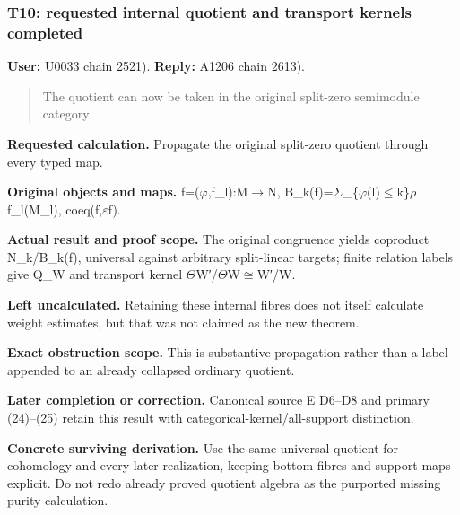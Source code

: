 \subsubsection{T10: requested internal quotient and transport kernels
completed}\label{TranscriptLedgerStage:t10-requested-internal-quotient-and-transport-kernels-completed}

\textbf{User:} U0033
\protect{} chain 2521).
\textbf{Reply:} A1206
\protect{} chain 2613).

\begin{quote}
The quotient can now be taken in the original split-zero semimodule
category
\end{quote}

\textbf{Requested calculation.} Propagate the original split-zero
quotient through every typed map.

\textbf{Original objects and maps.}
f=(\allowbreak{}\ensuremath{φ}\allowbreak{},f\_l):M\allowbreak{}\ensuremath{→}\allowbreak{}N,
B\_k(f)=\allowbreak{}\ensuremath{Σ}\allowbreak{}\_\{\allowbreak{}\ensuremath{φ}\allowbreak{}(l)\allowbreak{}\ensuremath{≤}\allowbreak{}k\}\allowbreak{}\ensuremath{ρ}\allowbreak{}
f\_l(M\_l), coeq(f,\allowbreak{}\ensuremath{ε}\allowbreak{}f).

\textbf{Actual result and proof scope.} The original congruence yields
coproduct N\_k/B\_k(f), universal against arbitrary split-linear
targets; finite relation labels give Q\_W and transport kernel
\allowbreak{}\ensuremath{Θ}\allowbreak{}W′/\allowbreak{}\ensuremath{Θ}\allowbreak{}W\allowbreak{}\ensuremath{≅}\allowbreak{}W′/W.

\textbf{Left uncalculated.} Retaining these internal fibres does not
itself calculate weight estimates, but that was not claimed as the new
theorem.

\textbf{Exact obstruction scope.} This is substantive propagation rather
than a label appended to an already collapsed ordinary quotient.

\textbf{Later completion or correction.} Canonical source E D6--D8 and
primary (24)--(25) retain this result with
categorical-kernel/all-support distinction.

\textbf{Concrete surviving derivation.} Use the same universal quotient
for cohomology and every later realization, keeping bottom fibres and
support maps explicit. Do not redo already proved quotient algebra as
the purported missing purity calculation.

